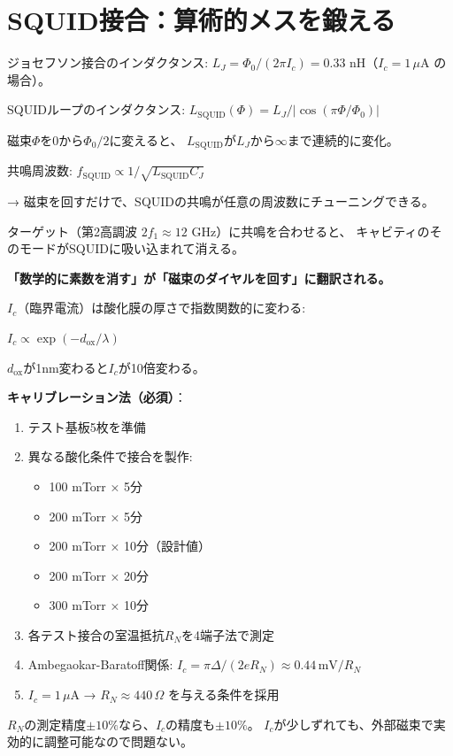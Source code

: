 \documentclass[12pt,a4paper]{article}
\begin{document}
\section{SQUID接合：算術的メスを鍛える}

\begin{theorybox}
ジョセフソン接合のインダクタンス:
$L_J = \Phi_0/(2\pi I_c) = 0.33$ nH（$I_c = 1\,\mu$A の場合）。

SQUIDループのインダクタンス:
$L_{\mathrm{SQUID}}(\Phi) = L_J / |\cos(\pi\Phi/\Phi_0)|$

磁束$\Phi$を$0$から$\Phi_0/2$に変えると、
$L_{\mathrm{SQUID}}$が$L_J$から$\infty$まで連続的に変化。

共鳴周波数: $f_{\mathrm{SQUID}} \propto 1/\sqrt{L_{\mathrm{SQUID}} C_J}$

→ 磁束を回すだけで、SQUIDの共鳴が任意の周波数にチューニングできる。

ターゲット（第2高調波 $2f_1 \approx 12$ GHz）に共鳴を合わせると、
キャビティのそのモードがSQUIDに吸い込まれて消える。

\textbf{「数学的に素数を消す」が「磁束のダイヤルを回す」に翻訳される。}
\end{theorybox}

\begin{practicebox}
$I_c$（臨界電流）は酸化膜の厚さで指数関数的に変わる:

$I_c \propto \exp(-d_{\mathrm{ox}}/\lambda)$

$d_{\mathrm{ox}}$が1nm変わると$I_c$が10倍変わる。

\textbf{キャリブレーション法（必須）}：
\begin{enumerate}
\item テスト基板5枚を準備
\item 異なる酸化条件で接合を製作:
  \begin{itemize}
  \item 100 mTorr × 5分
  \item 200 mTorr × 5分
  \item 200 mTorr × 10分（設計値）
  \item 200 mTorr × 20分
  \item 300 mTorr × 10分
  \end{itemize}
\item 各テスト接合の室温抵抗$R_N$を4端子法で測定
\item Ambegaokar-Baratoff関係: $I_c = \pi\Delta/(2eR_N) \approx 0.44\,\mathrm{mV}/R_N$
\item $I_c = 1\,\mu$A → $R_N \approx 440\,\Omega$ を与える条件を採用
\end{enumerate}

$R_N$の測定精度$\pm 10\%$なら、$I_c$の精度も$\pm 10\%$。
$I_c$が少しずれても、外部磁束で実効的に調整可能なので問題ない。
\end{practicebox}
\end{document}
